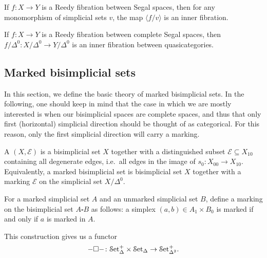 \documentclass[main.tex]{subfiles}
\begin{document}
\begin{theorem}
  \label{thm:inner_fibration_between_quasicategories}
  If $f\colon X \to Y$ is a Reedy fibration between Segal spaces, then for any monomorphism of simplicial sets $v$, the map $\langle f / v \rangle$ is an inner fibration.
\end{theorem}

\begin{corollary}
  If $f\colon X \to Y$ is a Reedy fibration between complete Segal spaces, then $f / \Delta^{0}\colon X / \Delta^{0} \to Y / \Delta^{0}$ is an inner fibration between quasicategories.
\end{corollary}

\subsection{Marked bisimplicial sets}
\label{ssc:marked_bisimplicial_sets}

In this section, we define the basic theory of marked bisimplicial sets. In the following, one should keep in mind that the case in which we are mostly interested is when our bisimplicial spaces are complete spaces, and thus that only first (horizontal) simplicial direction should be thought of as categorical. For this reason, only the first simplicial direction will carry a marking.

\begin{definition}
  A  $(X, \mathcal{E})$ is a bisimplicial set $X$ together with a distinguished subset $\mathcal{E} \subseteq X_{10}$ containing all degenerate edges, i.e.\ all edges in the image of $s_{0}\colon X_{00} \to X_{10}$. Equivalently, a marked bisimplicial set is bisimplicial set $X$ together with a marking $\mathcal{E}$ on the simplicial set $X / \Delta^{0}$.
\end{definition}

\begin{definition}
  For a marked simplicial set $A$ and an unmarked simplicial set $B$, define a marking on the bisimplicial set $A \square B$ as follows: a simplex $(a, b) \in A_{1} \times B_{0}$ is marked if and only if $a$ is marked in $A$.
\end{definition}

This construction gives us a functor
\begin{equation*}
  - \square -  \colon \mathcal{S}\mathrm{et}_{\Delta}^{+} \times \mathcal{S}\mathrm{et}_{\Delta} \to \mathcal{S}\mathrm{et}_{\Delta^{2}}^{+}.
\end{equation*}
\end{document}
